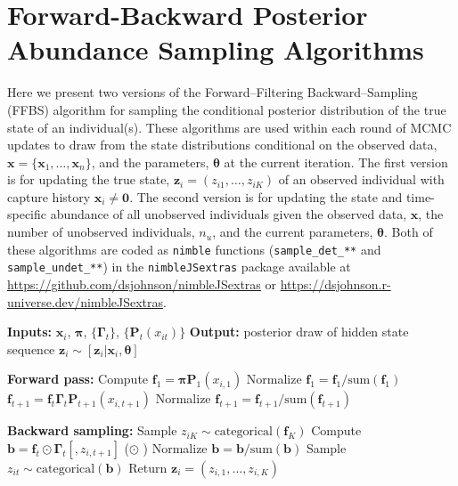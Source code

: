 \documentclass[12pt]{article}
\newcommand{\bx}{\ensuremath{\mathbf{x}}}
\newcommand{\bz}{\ensuremath{\mathbf{z}}}
\newcommand{\bpi}{\ensuremath{\boldsymbol{\pi}}}
\newcommand{\bG}{\ensuremath{\boldsymbol{\Gamma}}}
\newcommand{\bt}{\ensuremath{\boldsymbol{\theta}}}
\begin{document}
\clearpage

\appendix



\section{Forward-Backward Posterior Abundance Sampling Algorithms}

Here we present two versions of the Forward--Filtering Backward--Sampling (FFBS) algorithm for sampling the conditional posterior distribution of the true state of an individual(s). These algorithms are used within each round of MCMC updates to draw from the state distributions conditional on the observed data, $\bx=\{\bx_1,\dots,\bx_n\}$, and the parameters, $\bt$ at the current iteration. The first version is for updating the true state, $\bz_i=(z_{i1},\dots,z_{iK})$ of an observed individual with capture history $\bx_i\ne\mathbf{0}$. The second version is for updating the state and time-specific abundance of all unobserved individuals given the observed data, $\bx$, the number of unobserved individuals, $n_u$, and the current parameters, $\bt$. Both of these algorithms are coded as \verb|nimble| functions ({\tt \verb|sample_det_**|} and {\tt \verb|sample_undet_**|}) in the \verb|nimbleJSextras| package available at \href{https://github.com/dsjohnson/nimbleJSextras}{https://github.com/dsjohnson/nimbleJSextras} or \href{https://dsjohnson.r-universe.dev/nimbleJSextras}{https://dsjohnson.r-universe.dev/nimbleJSextras}.

\begin{algorithm}[H]
\caption{FFBS for Observed Individuals}
\begin{algorithmic}[1]
\STATE \textbf{Inputs:} $\bx_i$, $\bpi$, $\{\bG_t\}$, $\{\mathbf{P}_t(x_{it})\}$
\STATE \textbf{Output:} posterior draw of hidden state sequence $\mathbf{z}_i \sim [\mathbf{z}_i|\bx_i, \bt]$

\vspace{0.5em}
\STATE \textbf{Forward pass:}
\STATE Compute $\mathbf{f}_1 = \bpi \mathbf{P}_1(x_{i,1})$
\STATE Normalize $\mathbf{f}_{1} = \mathbf{f}_{1}/\text{sum}(\mathbf{f}_{1})$
    \STATE $\mathbf{f}_{t+1} = \mathbf{f}_{t} \bG_{t} \mathbf{P}_{t+1}(x_{i,t+1}) $
    \STATE Normalize $\mathbf{f}_{t+1} = \mathbf{f}_{t+1}/\text{sum}(\mathbf{f}_{t+1})$
\ENDFOR

\vspace{0.5em}
\STATE \textbf{Backward sampling:}
\STATE Sample $z_{iK} \sim \text{categorical}(\mathbf{f}_K)$
    \STATE Compute $\mathbf{b} = \mathbf{f}_t \odot \bG_t[,z_{i,t+1}]$ ($\odot$ )
    \STATE Normalize $\mathbf{b} = \mathbf{b}/\text{sum}(\mathbf{b})$
     \STATE Sample $z_{it} \sim \text{categorical}(\mathbf{b})$
\ENDFOR
\STATE Return $\mathbf{z}_i=(z_{i,1},\dots,z_{i,K})$
\end{algorithmic}
\end{algorithm}
\end{document}
